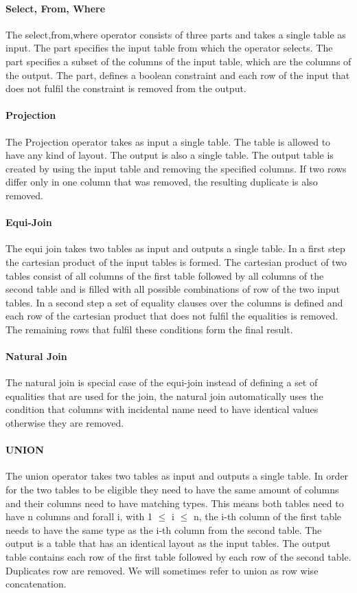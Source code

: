 \paragraph{Select, From, Where}
The select,from,where operator consists of three parts and takes a single table as input. The  part specifies the input table from which the operator selects. The  part specifies a subset of the columns of the input table, which are the columns of the output.
The  part, defines a boolean constraint and each row of the input that does not fulfil the constraint is removed from the output. 
\paragraph{Projection}
The Projection operator takes as input a single table. The table is allowed to have any kind of layout. The output is also a single table. The output table is created by using the input table and removing the specified columns. If two rows differ only in one column that was removed, the resulting duplicate is also removed. 
\paragraph{Equi-Join}
The equi join takes two tables as input and outputs a single table. In a first step the cartesian product of the input tables is formed. The cartesian product of two tables consist of all columns of the first table followed by all columns of the second table and is filled with all possible combinations of row of the two input tables. In a second step a set of equality clauses over the columns is defined and each row of the cartesian product that does not fulfil the equalities is removed. The remaining rows that fulfil these conditions form the final result.
\paragraph{Natural Join}
The natural join is special case of the equi-join instead of defining a set of equalities that are used for the join, the natural join automatically uses the condition that columns with incidental name need to have identical values otherwise they are removed. 

\paragraph{UNION}
The union operator takes two tables as input and outputs a single table. In order for the two tables to be eligible they need to have the same amount of columns and their columns need to have matching types. This means both tables need to have n columns and forall i, with  1 $\leq$ i $\leq$ n, the i-th column of the first table needs to have the same type as the i-th column from the second table. The output is a table that has an identical layout as the input tables.
The output table contains each row of the first table followed by each row of the second table. Duplicates row are removed. We will sometimes refer to union as row wise concatenation.

